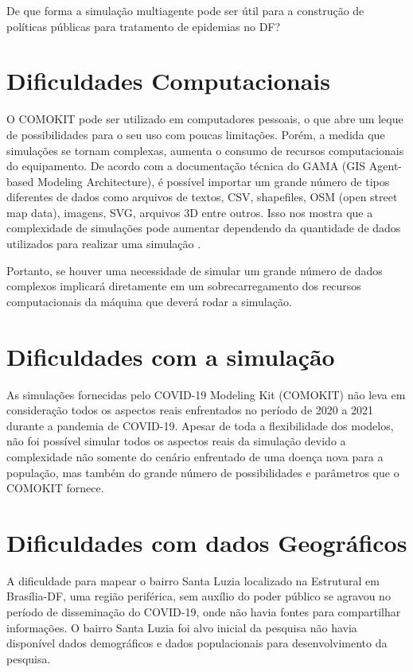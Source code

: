 
De que forma a simulação multiagente pode ser útil para a construção de políticas públicas para tratamento de epidemias no DF?

\section{Dificuldades Computacionais}

O COMOKIT pode ser utilizado em computadores pessoais, o que abre um leque de possibilidades para o seu uso com poucas limitações. Porém, a medida que simulações se tornam complexas, aumenta o consumo de recursos computacionais do equipamento. De acordo com a documentação técnica do GAMA (GIS Agent-based Modeling Architecture), é possível importar um grande número de tipos diferentes de dados como arquivos de textos, CSV, shapefiles, OSM (open street map data), imagens, SVG, arquivos 3D entre outros. Isso nos mostra que a complexidade de simulações pode aumentar dependendo da quantidade de dados utilizados para realizar uma simulação \cite{gamaplataform} .

Portanto, se houver uma necessidade de simular um grande número de dados complexos implicará diretamente em um sobrecarregamento dos recursos computacionais da máquina que deverá rodar a simulação.


\section{Dificuldades com a  simulação}

As simulações fornecidas pelo COVID-19 Modeling Kit (COMOKIT) não leva em consideração todos os aspectos reais enfrentados no período de 2020 a 2021 durante a pandemia de COVID-19. Apesar de toda a flexibilidade dos modelos, não foi possível simular todos os aspectos reais da simulação devido a complexidade não somente do cenário enfrentado de uma doença nova para a população, mas também do grande número de possibilidades e parâmetros que o COMOKIT fornece.

\section{Dificuldades com dados Geográficos}

A dificuldade para mapear o bairro Santa Luzia localizado na Estrutural em Brasília-DF, uma região periférica, sem auxílio do poder público se agravou no período de disseminação do COVID-19, onde não havia fontes para compartilhar informações. O bairro Santa Luzia foi alvo inicial da pesquisa não havia disponível dados demográficos e dados populacionais para desenvolvimento da pesquisa.


